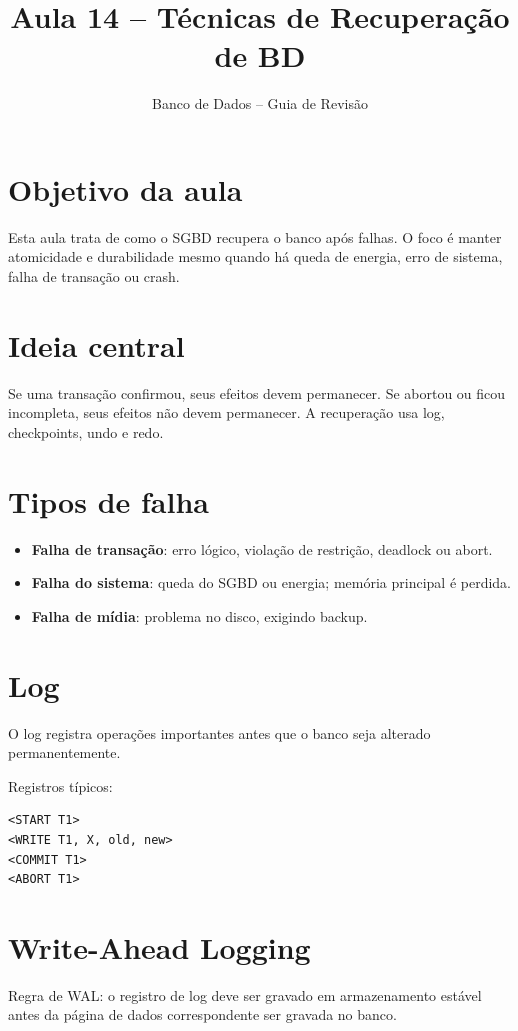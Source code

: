 \documentclass[12pt,a4paper]{article}
\title{Aula 14 -- Técnicas de Recuperação de BD}
\author{Banco de Dados -- Guia de Revisão}
\date{}
\begin{document}
\maketitle
\tableofcontents
\newpage

\section{Objetivo da aula}
Esta aula trata de como o SGBD recupera o banco após falhas. O foco é manter atomicidade e durabilidade mesmo quando há queda de energia, erro de sistema, falha de transação ou crash.

\section{Ideia central}
Se uma transação confirmou, seus efeitos devem permanecer. Se abortou ou ficou incompleta, seus efeitos não devem permanecer. A recuperação usa log, checkpoints, undo e redo.

\section{Tipos de falha}
\begin{itemize}
    \item \textbf{Falha de transação}: erro lógico, violação de restrição, deadlock ou abort.
    \item \textbf{Falha do sistema}: queda do SGBD ou energia; memória principal é perdida.
    \item \textbf{Falha de mídia}: problema no disco, exigindo backup.
\end{itemize}

\section{Log}
O log registra operações importantes antes que o banco seja alterado permanentemente.

Registros típicos:
\begin{verbatim}
<START T1>
<WRITE T1, X, old, new>
<COMMIT T1>
<ABORT T1>
\end{verbatim}

\section{Write-Ahead Logging}
Regra de WAL: o registro de log deve ser gravado em armazenamento estável antes da página de dados correspondente ser gravada no banco.
\end{document}
